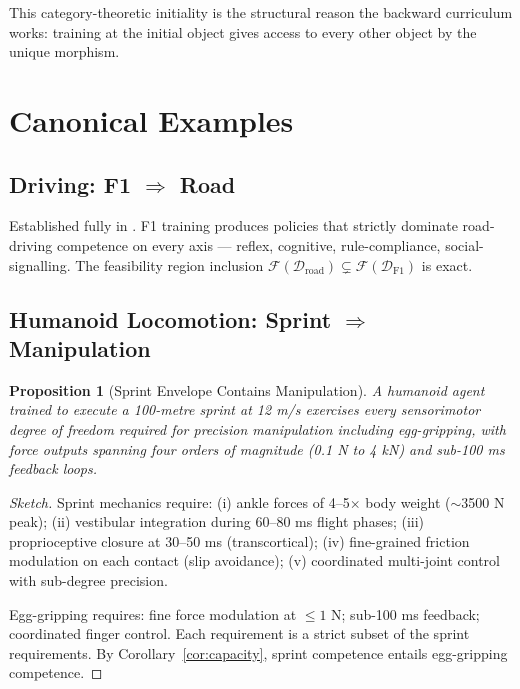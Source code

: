 \documentclass[11pt,twocolumn,a4paper]{article}
\newtheorem{proposition}[theorem]{Proposition}
\newcommand{\cF}{\mathcal{F}}
\newcommand{\cD}{\mathcal{D}}
\begin{document}
This category-theoretic initiality is the structural reason the backward curriculum works: training at the initial object gives access to every other object by the unique morphism.


\section{Canonical Examples}
\label{sec:examples}

\subsection{Driving: F1 $\Rightarrow$ Road}

Established fully in \cite{sachikonye2026driving}. F1 training produces policies that strictly dominate road-driving competence on every axis --- reflex, cognitive, rule-compliance, social-signalling. The feasibility region inclusion $\cF(\cD_{\text{road}}) \subsetneq \cF(\cD_{\text{F1}})$ is exact.

\subsection{Humanoid Locomotion: Sprint $\Rightarrow$ Manipulation}

\begin{proposition}[Sprint Envelope Contains Manipulation]
\label{prop:sprint-contains-manip}
A humanoid agent trained to execute a 100-metre sprint at 12 m/s exercises every sensorimotor degree of freedom required for precision manipulation including egg-gripping, with force outputs spanning four orders of magnitude (0.1 N to 4 kN) and sub-100 ms feedback loops.
\end{proposition}

\begin{proof}[Sketch]
Sprint mechanics require: (i) ankle forces of 4--5$\times$ body weight ($\sim$3500 N peak); (ii) vestibular integration during 60--80 ms flight phases; (iii) proprioceptive closure at 30--50 ms (transcortical); (iv) fine-grained friction modulation on each contact (slip avoidance); (v) coordinated multi-joint control with sub-degree precision.

Egg-gripping requires: fine force modulation at $\le 1$ N; sub-100 ms feedback; coordinated finger control. Each requirement is a strict subset of the sprint requirements. By Corollary~\ref{cor:capacity}, sprint competence entails egg-gripping competence.
\end{proof}
\end{document}
